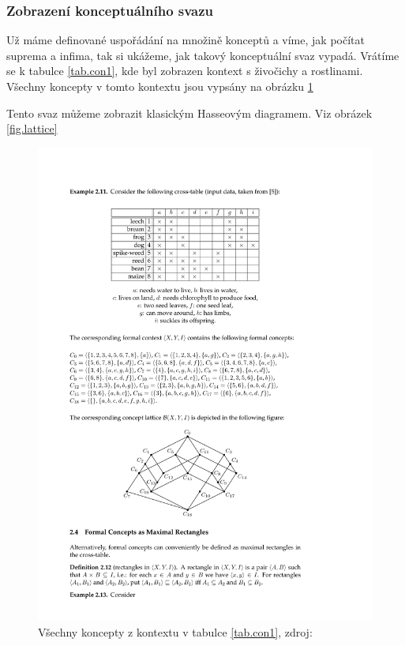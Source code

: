 \documentclass[12pt]{article}
\newcommand{\sssection}[1]{\subsubsection{#1}}
\newcommand{\adds}[1]{\left\{#1\right\}}
\newcommand{\up}{^{\uparrow}}
\newcommand{\downup}{^{\downarrow\uparrow}}
\newcommand{\bigsup}{\bigvee}
\begin{document}


\sssection{Zobrazení konceptuálního svazu}
Už máme definované uspořádání na množině konceptů a víme, jak počítat suprema a infima, tak si ukážeme, jak takový konceptuální svaz vypadá. Vrátíme se k tabulce \ref{tab.con1}, kde byl zobrazen kontext s živočichy a rostlinami. Všechny koncepty v tomto kontextu jsou vypsány na obrázku \ref{fig.concepts} 

Tento svaz můžeme zobrazit klasickým Hasseovým diagramem. Viz obrázek \ref{fig.lattice}

\begin{figure}
  \centering
  \includegraphics[width=14cm]{obrazky/koncepty.pdf}
  \caption{Všechny koncepty z kontextu v tabulce \ref{tab.con1}, zdroj: \cite{belfcaskr}}
  \label{fig.concepts}
\end{figure}
\end{document}
